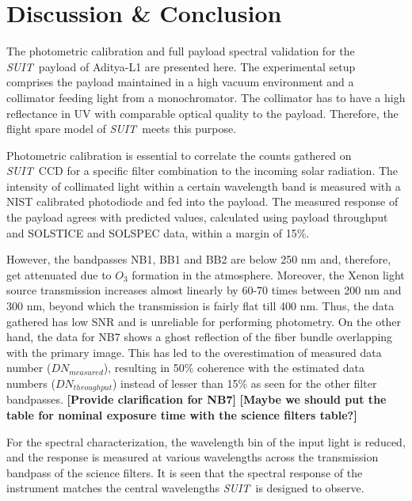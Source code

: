 \documentclass[12pt]{spieman}  %
\newcommand{\suit}{{\it SUIT~}}
\newcommand{\sr}[1]{{\bf\color{red} [#1]}}
\newcommand{\js}[1]{{\bf\color{magenta} [#1]}}
\begin{document}
\section{Discussion \& Conclusion}\label{sec:conc}

The photometric calibration and full payload spectral validation for the \suit payload of Aditya-L1 are presented here. The experimental setup comprises the payload maintained in a high vacuum environment and a collimator feeding light from a monochromator. The collimator has to have a high reflectance in UV with comparable optical quality to the payload. Therefore, the flight spare model of \suit meets this purpose.

Photometric calibration is essential to correlate the counts gathered on \suit CCD for a specific filter combination to the incoming solar radiation. The intensity of collimated light within a certain wavelength band is measured with a NIST calibrated photodiode and fed into the payload. The measured response of the payload agrees with predicted values, calculated using payload throughput and SOLSTICE and SOLSPEC data, within a margin of 15\%. 

However, the bandpasses NB1, BB1 and BB2 are below 250 nm and, therefore, get attenuated due to $O_3$ formation in the atmosphere. Moreover, the Xenon light source transmission increases almost linearly by 60-70 times between 200 nm and 300 nm, beyond which the transmission is fairly flat till 400 nm. Thus, the data gathered has low SNR and is unreliable for performing photometry. 
On the other hand, the data for NB7 shows a ghost reflection of the fiber bundle overlapping with the primary image. This has led to the overestimation of measured data number ($DN_{measured}$), resulting in 50\% coherence with the estimated data numbers ($DN_{throughput}$) instead of lesser than 15\% as seen for the other filter bandpasses.\js{Provide clarification for NB7}
\sr{Maybe we should put the table for nominal exposure time with the science filters table?} 

For the spectral characterization, the wavelength bin of the input light is reduced, and the response is measured at various wavelengths across the transmission bandpass of the science filters. It is seen that the spectral response of the instrument matches the central wavelengths \suit is designed to observe.

\end{document}
